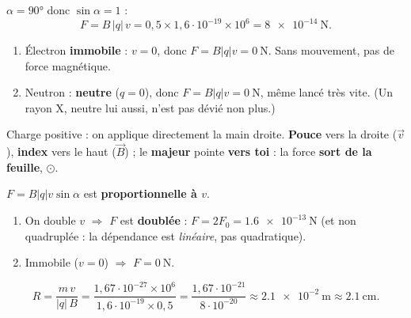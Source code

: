 \documentclass[11pt,a4paper]{article}
\newcommand{\vv}[1]{\vec{#1}}\newcommand{\ds}{\displaystyle}
\begin{document}
\begin{corrige}
$\alpha=\ang{90}$ donc $\sin\alpha=1$ :
\[ F=B\,|q|\,v=0{,}5\times1{,}6\cdot10^{-19}\times10^{6}=\qty{8e-14}{\newton}. \]
\end{corrige}

\begin{corrige}
\begin{enumerate}[label=\alph*)]
  \item Électron \textbf{immobile} : $v=0$, donc $F=B|q|v=\qty{0}{\newton}$. Sans mouvement, pas de
        force magnétique.
  \item Neutron : \textbf{neutre} ($q=0$), donc $F=B|q|v=\qty{0}{\newton}$, même lancé très vite.
        (Un rayon X, neutre lui aussi, n'est pas dévié non plus.)
\end{enumerate}
\end{corrige}

\begin{corrige}
Charge positive : on applique directement la main droite. \textbf{Pouce} vers la droite ($\vv{v}$),
\textbf{index} vers le haut ($\vv{B}$) ; le \textbf{majeur} pointe \textbf{vers toi} : la force
\textbf{sort de la feuille}, $\odot$.
\end{corrige}

\begin{corrige}
$F=B|q|v\sin\alpha$ est \textbf{proportionnelle à $v$}.
\begin{enumerate}[label=\alph*)]
  \item On double $v$ $\Rightarrow$ $F$ est \textbf{doublée} : $F=2F_0=\qty{1.6e-13}{\newton}$
        (et non quadruplée : la dépendance est \emph{linéaire}, pas quadratique).
  \item Immobile ($v=0$) $\Rightarrow$ $F=\qty{0}{\newton}$.
\end{enumerate}
\end{corrige}

\begin{corrige}
\[ R=\frac{m\,v}{|q|\,B}=\frac{1{,}67\cdot10^{-27}\times10^{6}}{1{,}6\cdot10^{-19}\times0{,}5}
    =\frac{1{,}67\cdot10^{-21}}{8\cdot10^{-20}}\approx\qty{2.1e-2}{\metre}\approx\qty{2.1}{\centi\metre}. \]
\end{corrige}
\end{document}
